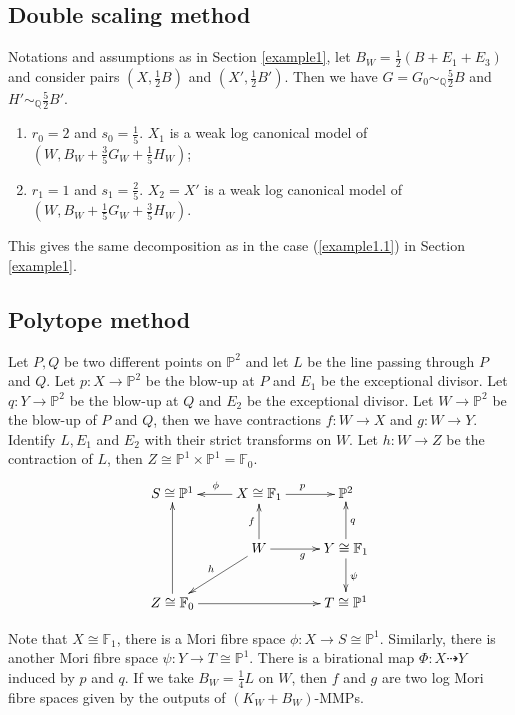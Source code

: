 \documentclass[11pt]{amsart}
\begin{document}
\subsection{Double scaling method}
Notations and assumptions as in Section \ref{example1}, let $B_{W}=\frac{1}{2}(B+E_{1}+E_{3})$ and consider pairs $(X,\frac{1}{2}B)$ and $(X',\frac{1}{2}B')$. Then we have $G=G_{0}\sim_{\mathbb{Q}}\frac{5}{2}B$ and $H'\sim_{\mathbb{Q}}\frac{5}{2}B'$.

\begin{enumerate}
  \item $r_{0}=2$ and $s_{0}=\frac{1}{5}$. $X_{1}$ is a weak log canonical model of $(W,B_{W}+\frac{3}{5}G_{W}+\frac{1}{5}H_{W})$;
  \item  $r_{1}=1$ and $s_{1}=\frac{2}{5}$. $X_{2}= X'$ is a weak log canonical model of $(W,B_{W}+\frac{1}{5}G_{W}+\frac{3}{5}H_{W})$.
\end{enumerate}

This gives the same decomposition as in the case (\ref{example1.1}) in  Section \ref{example1}.

\subsection{Polytope method}
Let  $P,Q$ be two different points on $\mathbb{P}^{2}$ and let $L$ be the line passing through $P$ and $Q$. Let $p:X\to \mathbb{P}^{2}$ be the blow-up at $P$ and $E_{1}$ be the exceptional divisor. Let $q:Y\to \mathbb{P}^{2}$ be the blow-up at $Q$ and $E_{2}$ be the exceptional divisor. Let $W\to \mathbb{P}^{2}$ be the blow-up of $P$ and $Q$, then we have contractions $f:W\to X$ and $g:W\to Y$. Identify $L,E_{1}$ and $E_{2}$ with their strict transforms on  $W$. Let $h:W\to Z$ be the contraction of $L$, then $Z\cong \mathbb{P}^{1} \times \mathbb{P}^{1}=\mathbb{F}_{0}$.
\[
  \xymatrix{
    S\cong \mathbb{P}^{1}&X\cong \mathbb{F}_{1}\ar[l]_{\phi}\ar[r]^{p} & \mathbb{P}^{2} \\
    &W\ar[u]^{f}\ar[r]_{g}\ar[ld]_{h} & Y\cong \mathbb{F}_{1}\ar[u]_{q}\ar[d]^{\psi}\\
    Z\cong \mathbb{F}_{0}\ar[uu]\ar[rr]&&T\cong \mathbb{P}^{1}
  }
\]

Note that $X\cong \mathbb{F}_{1}$, there is a  Mori fibre space $\phi:X\to S \cong \mathbb{P}^{1}$. Similarly, there is another Mori fibre space $\psi: Y\to T\cong \mathbb{P}^{1}$. There is a birational map $\Phi: X\dashrightarrow  Y$ induced by $p$ and $q$. If we take $B_{W}=\frac{1}{4}L$ on $W$, then $f$ and $g$ are two log Mori fibre spaces given by the outputs of $(K_{W}+B_{W})$-MMPs.
\end{document}
